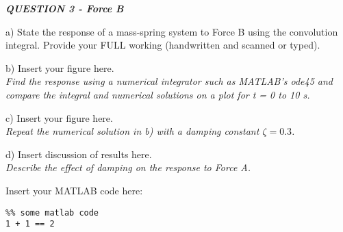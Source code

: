 \begin{tcolorbox}[colback=gray!50,enhanced,sharp corners,frame hidden,halign=left]
    \textbf{\textit{QUESTION 3 - Force B}}
\end{tcolorbox}

a) State the response of a mass-spring system to Force B using the convolution integral. Provide your FULL working (handwritten and scanned or typed).
\begin{flushright}
    [4 Marks*]
\end{flushright}







\noindent\makebox[\linewidth]{\rule{\linewidth}{0.4pt}}
b) Insert your figure here. \\
\textit{Find the response using a numerical integrator such as MATLAB’s ode45 and compare the integral and numerical solutions on a plot for t = 0 to 10 s. }
\begin{flushright}
\end{flushright}









\noindent\makebox[\linewidth]{\rule{\linewidth}{0.4pt}}
c) Insert your figure here. \\
\textit{Repeat the numerical solution in b) with a damping constant $\zeta = 0.3$.}
\begin{flushright}
\end{flushright}









\noindent\makebox[\linewidth]{\rule{\linewidth}{0.4pt}}
d) Insert discussion of results here. \\
\textit{Describe the effect of damping on the response to Force A.}
\begin{flushright}
\end{flushright}










\noindent\makebox[\linewidth]{\rule{\linewidth}{0.4pt}}
Insert your MATLAB code here:

\begin{lstlisting}
%% some matlab code
1 + 1 == 2
\end{lstlisting}


\clearpage
